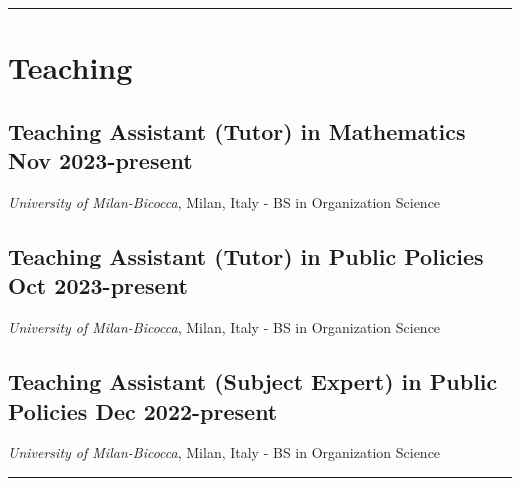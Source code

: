 \documentclass[8pt,]{article}
\providecommand{\tightlist}{%
  \setlength{\itemsep}{0pt}\setlength{\parskip}{0pt}}
\renewenvironment{itemize}{
  \begin{list}{}{
    \setlength{\leftmargin}{1.5em}
  }
}{
  \end{list}
}
\begin{document}
\bigskip \hrule

\hypertarget{teaching}{%
\section{Teaching}\label{teaching}}

\hypertarget{teaching-assistant-tutor-in-mathematics-nov-2023-present}{%
\subsection{\texorpdfstring{Teaching Assistant (Tutor) in Mathematics
\hfill Nov
2023-present}{Teaching Assistant (Tutor) in Mathematics Nov 2023-present}}\label{teaching-assistant-tutor-in-mathematics-nov-2023-present}}

\begin{itemize}
\tightlist
\item
  \emph{University of Milan-Bicocca}, Milan, Italy - BS in Organization
  Science
\end{itemize}

\hypertarget{teaching-assistant-tutor-in-public-policies-oct-2023-present}{%
\subsection{\texorpdfstring{Teaching Assistant (Tutor) in Public
Policies \hfill Oct
2023-present}{Teaching Assistant (Tutor) in Public Policies Oct 2023-present}}\label{teaching-assistant-tutor-in-public-policies-oct-2023-present}}

\begin{itemize}
\tightlist
\item
  \emph{University of Milan-Bicocca}, Milan, Italy - BS in Organization
  Science
\end{itemize}

\hypertarget{teaching-assistant-subject-expert-in-public-policies-dec-2022-present}{%
\subsection{\texorpdfstring{Teaching Assistant (Subject Expert) in
Public Policies \hfill Dec
2022-present}{Teaching Assistant (Subject Expert) in Public Policies Dec 2022-present}}\label{teaching-assistant-subject-expert-in-public-policies-dec-2022-present}}

\begin{itemize}
\item
  \emph{University of Milan-Bicocca}, Milan, Italy - BS in Organization
  Science

  \bigskip \hrule
\end{itemize}
\end{document}

